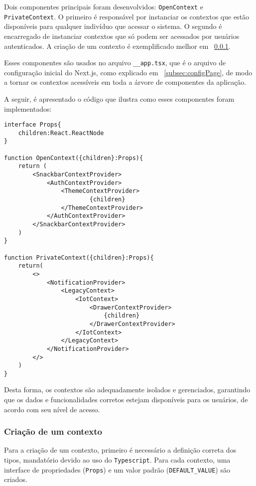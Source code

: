 Dois componentes principais foram desenvolvidos: \texttt{OpenContext} e \texttt{PrivateContext}. O primeiro é responsável por instanciar os contextos que estão disponíveis para qualquer indivíduo que acessar o sistema. O segundo é encarregado de instanciar contextos que só podem ser acessados por usuários autenticados. A criação de um contexto é exemplificado melhor em ~\ref{subsubsec:contextCreation}.

Esses componentes são usados no arquivo \texttt{\_\_app.tsx}, que é o arquivo de configuração inicial do Next.js, como explicado em ~\ref{subsec:configPage}, de modo a tornar os contextos acessíveis em toda a árvore de componentes da aplicação.

A seguir, é apresentado o código que ilustra como esses componentes foram implementados:

\begin{verbatim}
interface Props{
    children:React.ReactNode
}

function OpenContext({children}:Props){
    return (
        <SnackbarContextProvider>
            <AuthContextProvider>
                <ThemeContextProvider>
                        {children}
                </ThemeContextProvider>
            </AuthContextProvider>
        </SnackbarContextProvider>
    )
}

function PrivateContext({children}:Props){
    return(
        <>
            <NotificationProvider>
                <LegacyContext>
                    <IotContext>
                        <DrawerContextProvider>
                            {children}
                        </DrawerContextProvider>
                    </IotContext>
                </LegacyContext>
            </NotificationProvider>
        </> 
    )
}
\end{verbatim}

Desta forma, os contextos são adequadamente isolados e gerenciados, garantindo que os dados e funcionalidades corretos estejam disponíveis para os usuários, de acordo com seu nível de acesso.


\subsubsection{Criação de um contexto}\label{subsubsec:contextCreation}
Para a criação de um contexto, primeiro é necessário a definição correta dos tipos, mandatório devido ao uso do \texttt{Typescript}. Para cada contexto, uma interface de propriedades (\texttt{Props}) e um valor padrão (\texttt{DEFAULT\_VALUE}) são criados. 

